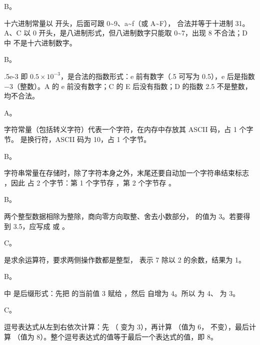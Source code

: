 \documentclass[a4paper,11pt]{article}
\begin{document}


\q B。\begin{analysis}十六进制常量以  开头，后面可跟 0\textasciitilde 9、a\textasciitilde f（或 A\textasciitilde F）， 合法并等于十进制 31。A、C 以 0 开头，是八进制形式，但八进制数字只能取 0\textasciitilde 7，出现 8 不合法；D 中  不是十六进制数字。\end{analysis}

\q B。\begin{analysis}.5e-3 即 $0.5\times10^{-3}$，是合法的指数形式：e 前有数字（.5 可写为 0.5），e 后是指数 $-3$（整数）。A 的 e 前没有数字；C 的 E 后没有指数；D 的指数 2.5 不是整数，均不合法。\end{analysis}

\q A。\begin{analysis}字符常量（包括转义字符）代表一个字符，在内存中存放其 ASCII 码，占 1 个字节。 是换行符，ASCII 码为 10，占 1 个字节。\end{analysis}

\q B。\begin{analysis}字符串常量在存储时，除了字符本身之外，末尾还要自动加一个字符串结束标志 ，因此  占 2 个字节：第 1 个字节存 ，第 2 个字节存 。\end{analysis}

\q B。\begin{analysis}两个整型数据相除为整除，商向零方向取整、舍去小数部分， 的值为 3。若要得到 3.5，应写成  或 。\end{analysis}

\q C。\begin{analysis}\code{\%} 是求余运算符，要求两侧操作数都是整型， 表示 7 除以 2 的余数，结果为 1。\end{analysis}

\q B。\begin{analysis} 中  是后缀形式：先把  的当前值 3 赋给 ，然后  自增为 4。所以  为 4、 为 3。\end{analysis}

\q C。\begin{analysis}逗号表达式从左到右依次计算：先 （ 变为 3），再计算 （值为 6， 不变），最后计算 （值为 8）。整个逗号表达式的值等于最后一个表达式的值，即 8。\end{analysis}
\end{document}
